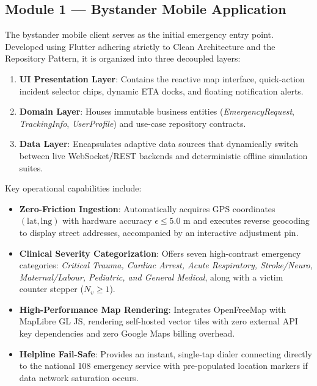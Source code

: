 \documentclass[conference]{IEEEtran}
\begin{document}
\subsection{Module 1 — Bystander Mobile Application}
The bystander mobile client serves as the initial emergency entry point. Developed using Flutter adhering strictly to Clean Architecture and the Repository Pattern, it is organized into three decoupled layers:
\begin{enumerate}
    \item \textbf{UI Presentation Layer}: Contains the reactive map interface, quick-action incident selector chips, dynamic ETA docks, and floating notification alerts.
    \item \textbf{Domain Layer}: Houses immutable business entities (\textit{EmergencyRequest}, \textit{TrackingInfo}, \textit{UserProfile}) and use-case repository contracts.
    \item \textbf{Data Layer}: Encapsulates adaptive data sources that dynamically switch between live WebSocket/REST backends and deterministic offline simulation suites.
\end{enumerate}

Key operational capabilities include:
\begin{itemize}
    \item \textbf{Zero-Friction Ingestion}: Automatically acquires GPS coordinates $(\text{lat}, \text{lng})$ with hardware accuracy $\epsilon \le 5.0\text{ m}$ and executes reverse geocoding to display street addresses, accompanied by an interactive adjustment pin.
    \item \textbf{Clinical Severity Categorization}: Offers seven high-contrast emergency categories: \textit{Critical Trauma, Cardiac Arrest, Acute Respiratory, Stroke/Neuro, Maternal/Labour, Pediatric, and General Medical}, along with a victim counter stepper ($N_v \ge 1$).
    \item \textbf{High-Performance Map Rendering}: Integrates OpenFreeMap with MapLibre GL JS, rendering self-hosted vector tiles with zero external API key dependencies and zero Google Maps billing overhead.
    \item \textbf{Helpline Fail-Safe}: Provides an instant, single-tap dialer connecting directly to the national 108 emergency service with pre-populated location markers if data network saturation occurs.
\end{itemize}
\end{document}
